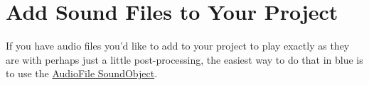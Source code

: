 \section{Add Sound Files to Your Project}\label{addSoundFiles}

If you have audio files you'd like to add to your project to play
exactly as they are with perhaps just a little post-processing, the
easiest way to do that in blue is to use the
\protect\hyperlink{audioFile}{AudioFile SoundObject}.
